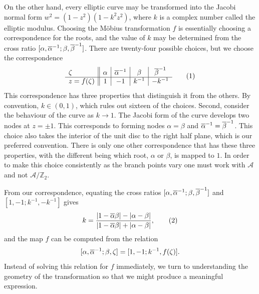\documentclass{article}
\begin{document}
On the other hand, every elliptic curve may be transformed into the Jacobi normal form $w^2 = (1-z^2)(1-k^2z^2)$, where $k$ is a complex number called the elliptic modulus. 
Choosing the M\"obius transformation $f$ is essentially choosing a correspondence for the roots, and the value of $k$ may be determined from the cross ratio $[\alpha,\overline{\alpha}^{-1};\beta,\overline{\beta}^{-1}]$.
There are twenty-four possible choices, but we choose the correspondence
\[
  \begin{array}{ l||c|c|c|c}
    \zeta & \alpha & \cji{\alpha} & \beta & \cji{\beta} \\
    \hline
    z = f(\zeta) & 1 & -1 & k^{-1} & -k^{-1}
  \end{array}
  \labelthis{eqn:choice f}
\]
This correspondence has three properties that distinguish it from the others. By convention, $k \in (0,1)$, which rules out sixteen of the choices. Second, consider the behaviour of the curve as $k\to 1$. The Jacobi form of the curve develops two nodes at $z=\pm 1$. This corresponds to forming nodes $\alpha=\beta$ and $\overline{\alpha}^{-1} = \overline{\beta}^{-1}$. This choice also takes the interior of the unit disc to the right half plane, which is our preferred convention. There is only one other correspondence that has these three properties, with the different being which root, $\alpha$ or $\beta$, is mapped to $1$. In order to make this choice consistently as the branch points vary one must work with $\mathcal{A}$ and not $\mathcal{A}/\mathbb{Z}_2$.




From our correspondence, equating the cross ratios $[\alpha,\overline{\alpha}^{-1};\beta,\overline{\beta}^{-1}]$ and\\ $[1,-1;k^{-1},-k^{-1}]$ gives
\[
k = \frac{\abs{1-\bar{\alpha}\beta}-\abs{\alpha-\beta}}{\abs{1-\bar{\alpha}\beta}+\abs{\alpha-\beta}},
\labelthis{eqn:def_k}
\]
and the map $f$ can be computed from the relation
\[
[\alpha,\overline{\alpha}^{-1};\beta,\zeta] = [1,-1;k^{-1},f(\zeta)].
\]
Instead of solving this relation for $f$ immediately, we turn to understanding the geometry of the transformation so that we might produce a meaningful expression.
\end{document}
